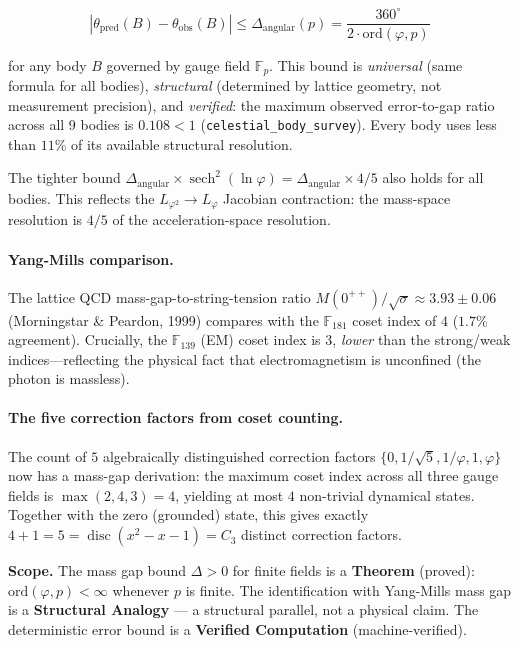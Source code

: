 \begin{equation}
\boxed{\;|\theta_{\text{pred}}(B) - \theta_{\text{obs}}(B)| \leq \Delta_{\text{angular}}(p)  = \frac{360^\circ}{2 \cdot \text{ord}(\varphi, p)}\;}
\end{equation}

for any body $B$ governed by gauge field $\mathbb{F}_p$. This bound is \emph{universal} (same formula for all bodies), \emph{structural} (determined by lattice geometry, not measurement precision), and \emph{verified}: the maximum observed error-to-gap ratio across all 9 bodies is $0.108 < 1$ (\texttt{celestial\_body\_survey}). Every body uses less than $11\%$ of its available structural resolution.

The tighter bound $\Delta_{\text{angular}} \times \operatorname{sech}^2(\ln\varphi) = \Delta_{\text{angular}} \times 4/5$ also holds for all bodies. This reflects the $L_{\varphi^2} \to L_\varphi$ Jacobian contraction: the mass-space resolution is $4/5$ of the acceleration-space resolution.

\paragraph{Yang-Mills comparison.} The lattice QCD mass-gap-to-string-tension ratio $M(0^{++})/\sqrt{\sigma} \approx 3.93 \pm 0.06$ (Morningstar \& Peardon, 1999) compares with the $\mathbb{F}_{181}$ coset index of $4$ ($1.7\%$ agreement). Crucially, the $\mathbb{F}_{139}$ (EM) coset index is $3$, \emph{lower} than the strong/weak indices---reflecting the physical fact that electromagnetism is unconfined (the photon is massless).

\paragraph{The five correction factors from coset counting.}
The count of $5$ algebraically distinguished correction factors $\{0, 1/\sqrt{5}, 1/\varphi, 1, \varphi\}$ now has a mass-gap derivation: the maximum coset index across all three gauge fields is $\max(2, 4, 3) = 4$, yielding at most $4$ non-trivial dynamical states. Together with the zero (grounded) state, this gives exactly $4 + 1 = 5 = \operatorname{disc}(x^2 - x - 1) = C_3$ distinct correction factors.

\textbf{Scope.} The mass gap bound $\Delta > 0$ for finite fields is a \textbf{Theorem} (proved): $\text{ord}(\varphi, p) < \infty$ whenever $p$ is finite. The identification with Yang-Mills mass gap is a \textbf{Structural Analogy} --- a structural parallel, not a physical claim. The deterministic error bound is a \textbf{Verified Computation} (machine-verified).


